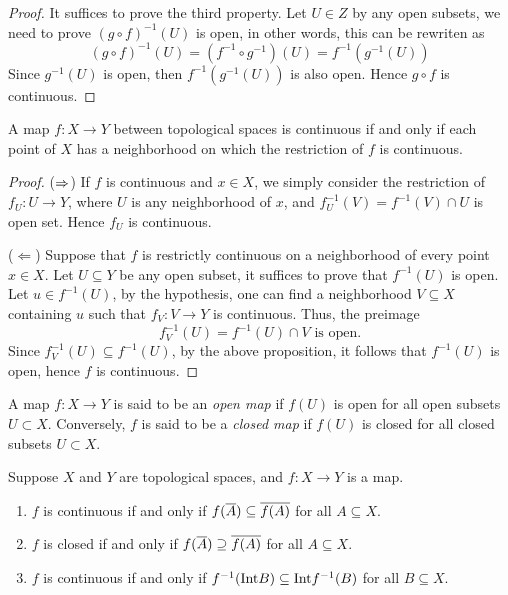 \begin{proof}
    It suffices to prove the third property. Let $U \in Z$ by any open subsets, we need to prove $(g \circ f)^{-1}(U)$ is open, in other words, this can be rewriten as 
    \[
        (g \circ f)^{-1}(U) = (f^{-1}\circ g^{-1})(U) = f^{-1}(g^{-1}(U))
    \]
    Since $g^{-1}(U)$ is open, then $f^{-1}(g^{-1}(U))$ is also open. Hence $g \circ f$ is continuous.
\end{proof}
\begin{proposition}
    A map $f: X \to Y$ between topological spaces is continuous if and only if each point of $X$ has a neighborhood on which the restriction of $f$ is continuous.
\end{proposition}
\begin{proof}
    ($\Rightarrow$) If $f$ is continuous and $x \in X$, we simply consider the restriction of $f_U: U \to Y$, where $U$ is any neighborhood of $x$, and $f^{-1}_U(V) = f^{-1}(V) \cap U$ is open set. Hence $f_U$ is continuous.

    ($\Leftarrow$) Suppose that $f$ is restrictly continuous on a neighborhood of every point $x \in X$. Let $U \subseteq Y$ be any open subset, it suffices to prove that $f^{-1}(U)$ is open. Let $u \in f^{-1}(U)$, by the hypothesis, one can find a neighborhood $V \subseteq X$ containing $u$ such that $f_V: V \to Y$ is continuous. Thus, the preimage
    \[
        f_V^{-1}(U) = f^{-1}(U) \cap V \text{ is open.}
    \]
    Since $f_V^{-1}(U) \subseteq f^{-1}(U)$, by the above proposition, it follows that $f^{-1}(U)$ is open, hence $f$ is continuous.
\end{proof}
\begin{definition}
    A map $f: X \to Y$ is said to be an \textit{open map} if $f(U)$ is open for all open subsets $U \subset X$. Conversely, $f$ is said to be a \textit{closed map} if $f(U)$ is closed for all closed subsets $U \subset X$.
\end{definition}
\begin{proposition}
    Suppose $X$ and $Y$ are topological spaces, and $f: X \to Y$ is a map. 
    \begin{enumerate}
        \item $f$ is continuous if and only if $f(\overline{A}) \subseteq \overline{f(A)}$ for all $A \subseteq X$.
        \item $f$ is closed if and only if $f(\overline{A}) \supseteq \overline{f(A)}$ for all $A \subseteq X$.
        \item $f$ is continuous if and only if $f^{-1}(\mathrm{Int}{B}) \subseteq \mathrm{Int}{f^{-1}(B)}$ for all $B \subseteq X$.
    \end{enumerate}
\end{proposition}

